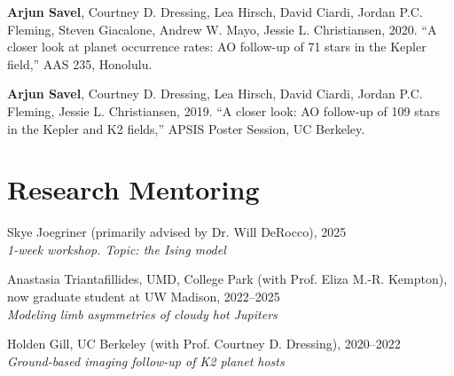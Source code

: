 \documentclass[letterpaper,12pt]{article}
\newcommand{\shorterSection}[1]{\section{#1}}
\renewcommand{\small}{\normalsize}
\renewcommand{\scriptsize}{\normalsize}
\newcommand{\resumeSubHeadingListStart}[1][]{\begin{itemize}[leftmargin=*,#1]}
\begin{document}
\begin{list}{}{\cvlist}
  
  \item[{\color{numcolor}\scriptsize2}]\textbf{Arjun Savel}, Courtney D. Dressing, Lea Hirsch, David Ciardi, Jordan P.C. Fleming, Steven Giacalone, Andrew W. Mayo, Jessie L. Christiansen, 2020. ``A closer look at planet occurrence rates: AO follow-up of 71 stars in the Kepler field,'' AAS 235, Honolulu.

  \item[{\color{numcolor}\scriptsize1}] \textbf{Arjun Savel}, Courtney D. Dressing, Lea Hirsch, David Ciardi, Jordan P.C. Fleming, Jessie L. Christiansen, 2019. ``A closer look: AO follow-up of 109 stars in the Kepler and K2 fields,'' APSIS Poster Session, UC Berkeley.



  \end{list}

\shorterSection{Research Mentoring}
\small
  \begin{list}{}{\cvlist}  

  \item[{\color{numcolor}}]Skye Joegriner (primarily advised by Dr. Will DeRocco), 2025 \\
    \textit{1-week workshop. Topic: the Ising model}
  \item[{\color{numcolor}}]Anastasia Triantafillides, UMD, College Park (with Prof. Eliza M.-R. Kempton), now graduate student at UW Madison, 2022--2025 \\
  \textit{Modeling limb asymmetries of cloudy hot Jupiters}
  \item[{\color{numcolor}}]Holden Gill, UC Berkeley (with Prof. Courtney D. Dressing), 2020--2022 \\
    \textit{Ground-based imaging follow-up of K2 planet hosts}


  \end{list}
\end{document}
